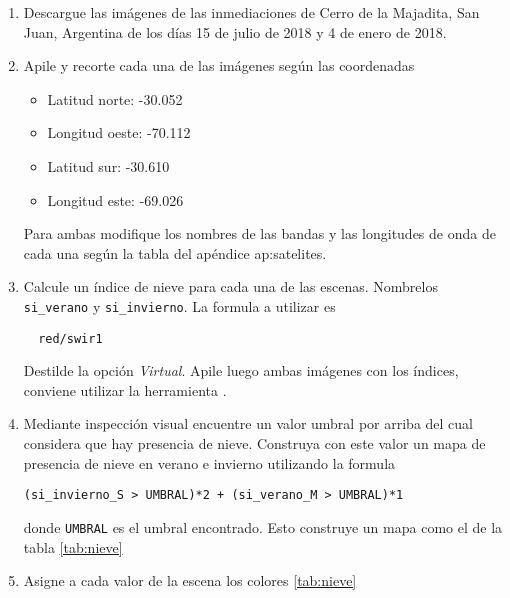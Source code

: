 \begin{enumerate}
\item Descargue las imágenes de las inmediaciones de Cerro de la Majadita, San Juan, Argentina de los días 15 de julio de 2018 y 4 de enero de 2018.

\item Apile y recorte cada una de las imágenes según las coordenadas

\begin{itemize}
    \item Latitud norte: -30.052
    \item Longitud oeste: -70.112
    \item Latitud sur: -30.610
    \item Longitud este: -69.026
\end{itemize}

Para ambas modifique los nombres de las bandas y las longitudes de onda de cada una según la tabla del apéndice ap:satelites.

\item Calcule un índice de nieve para cada una de las escenas. Nombrelos \texttt{si\_verano} y \texttt{si\_invierno}. La formula a utilizar es

\begin{verbatim}
  red/swir1
\end{verbatim}

Destilde la opción \emph{Virtual}. Apile luego ambas imágenes con los índices, conviene utilizar la herramienta .

\item Mediante inspección visual encuentre un valor umbral por arriba del cual considera que hay presencia de nieve. Construya con este valor un mapa de presencia de nieve en verano e invierno utilizando la formula

\begin{verbatim}
(si_invierno_S > UMBRAL)*2 + (si_verano_M > UMBRAL)*1
\end{verbatim}

donde \texttt{UMBRAL} es el umbral encontrado. Esto construye un mapa como el de la tabla \ref{tab:nieve}

\item Asigne a cada valor de la escena los colores \ref{tab:nieve}


\end{enumerate}
